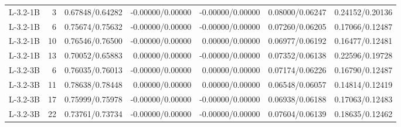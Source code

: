 \begin{tabular}{lrrrrrr}
L-3.2-1B & 3 & 0.67848/0.64282 & -0.00000/0.00000 & -0.00000/0.00000 & 0.08000/0.06247 & 0.24152/0.20136 \\
L-3.2-1B & 6 & 0.75674/0.75632 & -0.00000/0.00000 & -0.00000/0.00000 & 0.07260/0.06205 & 0.17066/0.12487 \\
L-3.2-1B & 10 & 0.76546/0.76500 & -0.00000/0.00000 & 0.00000/0.00000 & 0.06977/0.06192 & 0.16477/0.12481 \\
L-3.2-1B & 13 & 0.70052/0.65883 & 0.00000/0.00000 & -0.00000/0.00000 & 0.07352/0.06138 & 0.22596/0.19728 \\
L-3.2-3B & 6 & 0.76035/0.76013 & -0.00000/0.00000 & 0.00000/0.00000 & 0.07174/0.06226 & 0.16790/0.12487 \\
L-3.2-3B & 11 & 0.78638/0.78448 & 0.00000/0.00000 & 0.00000/0.00000 & 0.06548/0.06057 & 0.14814/0.12419 \\
L-3.2-3B & 17 & 0.75999/0.75978 & -0.00000/0.00000 & -0.00000/0.00000 & 0.06938/0.06188 & 0.17063/0.12483 \\
L-3.2-3B & 22 & 0.73761/0.73734 & -0.00000/0.00000 & -0.00000/0.00000 & 0.07604/0.06139 & 0.18635/0.12462 \\
\bottomrule
\end{tabular}
